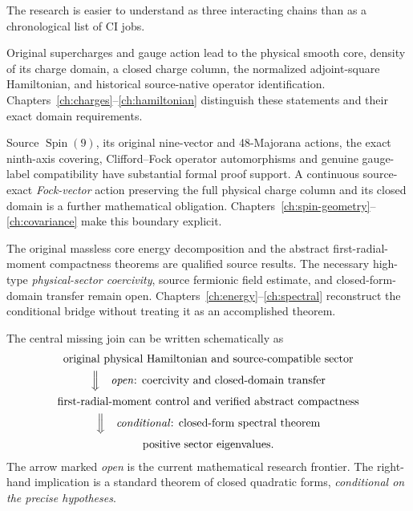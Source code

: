 The research is easier to understand as three interacting chains
than as a chronological list of CI jobs.

\begin{description}[leftmargin=1.4em,style=nextline]
 \item[The physical-operator chain.]
 Original supercharges and gauge action lead to the physical smooth
 core, density of its charge domain, a closed charge column, the
 normalized adjoint-square Hamiltonian, and historical source-native
 operator identification. Chapters~\ref{ch:charges}--\ref{ch:hamiltonian}
 distinguish these statements and their exact domain requirements.
 \item[The spatial-representation chain.]
 Source $\operatorname{Spin}(9)$, its original nine-vector and
 48-Majorana actions, the exact ninth-axis covering, Clifford--Fock
 operator automorphisms and genuine gauge-label compatibility have
 substantial formal proof support. A continuous source-exact
 \emph{Fock-vector} action preserving the full physical charge column
 and its closed domain is a further mathematical obligation.
 Chapters~\ref{ch:spin-geometry}--\ref{ch:covariance}
 make this boundary explicit.
 \item[The energy-and-compactness chain.]
 The original massless core energy decomposition and the abstract
 first-radial-moment compactness theorems are qualified source results.
 The necessary high-type \emph{physical-sector coercivity}, source
 fermionic field estimate, and closed-form-domain transfer remain
 open. Chapters~\ref{ch:energy}--\ref{ch:spectral} reconstruct the
 conditional bridge without treating it as an accomplished theorem.
\end{description}

The central missing join can be written schematically as
\begin{equation}\label{eq:intro-join}
\begin{gathered}
 \text{original physical Hamiltonian and source-compatible sector}\\
 \Big\Downarrow\quad\text{\emph{open}: coercivity and closed-domain transfer}\\
 \text{first-radial-moment control and verified abstract compactness}\\
 \Big\Downarrow\quad\text{\emph{conditional}: closed-form spectral theorem}\\
 \text{positive sector eigenvalues}.
\end{gathered}
\end{equation}
The arrow marked \emph{open} is the current mathematical research
frontier. The right-hand implication is a standard theorem of closed
quadratic forms, \emph{conditional on the precise hypotheses}.

